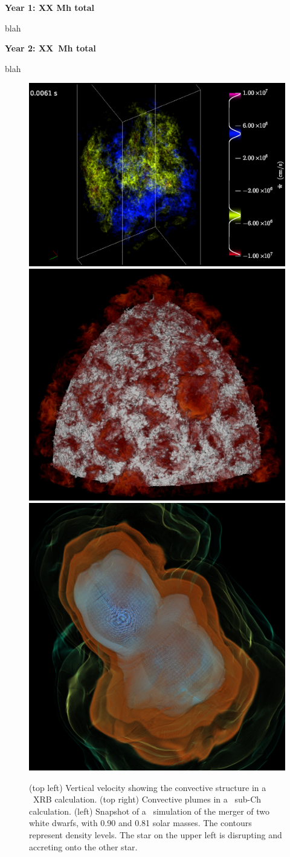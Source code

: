 \begin{tightitem}
\item {\bf Year 1: XX Mh total }
%
\begin{tightitem}
\item blah
\end{tightitem}
%
\item {\bf Year 2: XX~Mh total}
%
\begin{tightitem}
\item blah
\end{tightitem}
%
\end{tightitem}

\begin{figure}[t]
\centering
\includegraphics[width=0.42\linewidth]{xrb_vol_vz}
\hspace{0.25em}
\includegraphics[width=0.32\linewidth]{ConvPlumes} \\[0.1em]
\includegraphics[width=0.3\linewidth]{generic3plt00180}\hspace{0.5em}
\begin{minipage}[b]{0.44\linewidth}
\caption{\label{fig:current-runs} (top left) Vertical velocity showing the
  convective structure in a \maestro\ XRB calculation.  (top right)
  Convective plumes in a \maestro\ sub-Ch calculation.  (left)
  Snapshot of a \castro\ simulation of the merger of two white dwarfs,
  with 0.90 and 0.81 solar masses. The contours represent density
  levels. The star on the upper left is disrupting and accreting onto
  the other star.}
\end{minipage}
\end{figure}


